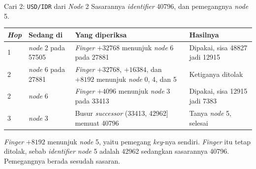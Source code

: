 \documentclass[aspectratio=169, table, 12pt]{beamer}
\begin{document}
\begin{frame}{{\Large Cari 2: \texttt{USD/IDR} dari \textit{Node} 2}}
  \vspace{4pt}
  {\small Sasarannya \textit{identifier} 40796, dan pemegangnya \textit{node} 5.}
  \vspace{4pt}
  \centering
  \scriptsize
  \begin{tabularx}{0.97\textwidth}{|l|l|X|l|}
    \hline
    \textbf{\textit{Hop}} & \textbf{Sedang di} & \textbf{Yang diperiksa} & \textbf{Hasilnya} \\
    \hline
    1 & \textit{node} 2 pada 57505 & \textit{Finger} $+32768$ menunjuk \textit{node} 6 pada 27881 & Dipakai, sisa 48827 jadi 12915 \\
    \hline
    2 & \textit{node} 6 pada 27881 & \textit{Finger} $+32768$, $+16384$, dan $+8192$ menunjuk \textit{node} 0, 4, dan 5 & Ketiganya ditolak \\
    \hline
    2 & \textit{node} 6 & \textit{Finger} $+4096$ menunjuk \textit{node} 3 pada 33413 & Dipakai, sisa 12915 jadi 7383 \\
    \hline
    3 & \textit{node} 3 & Busur \textit{successor} (33413, 42962] memuat 40796 & Tanya \textit{node} 5, selesai \\
    \hline
  \end{tabularx}

  \vspace{5pt}
  {\footnotesize \textit{Finger} $+8192$ menunjuk \textit{node} 5, yaitu pemegang \textit{key}-nya
  sendiri. \textit{Finger} itu tetap ditolak, sebab \textit{identifier node} 5 adalah 42962
  sedangkan sasarannya 40796. Pemegangnya berada sesudah sasaran.}
\end{frame}
\end{document}
